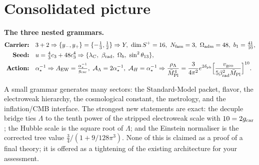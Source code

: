\section{Consolidated picture}

\par\medskip\noindent\textbf{The three nested grammars.}
\[
  \begin{aligned}
  \textbf{Carrier:}\quad & 3+2 \Rightarrow \{y_-,y_+\}=\{-\tfrac13,\tfrac12\}\Rightarrow Y,\ \dim S^+=16,\ \Nfam=3,\ \Oadm=48,\ b_1=\tfrac{41}{10},\\
  \textbf{Seed:}\quad & \useed=\tfrac43\cthree+48\cthree^4 \Rightarrow \{\lC,\ \betarad,\ \Omega_b,\ \sin^2\theta_{13}\},\\
  \textbf{Action:}\quad & \ainv \Rightarrow \AEW=\tfrac{\ainv}{\gcar},\ \AL=2\ainv,\ \AH=\ainv
  \Rightarrow \frac{\rho_\Lambda}{\Mbar^4}=\frac{3}{4\pi^2}e^{2\dph}\Bigl[\frac{v_{\mathrm{geo}}}{5\betarad^2\Mbar}\Bigr]^{10}.
  \end{aligned}
\]

\noindent A small grammar generates many sectors: the Standard-Model packet, flavor, the electroweak
hierarchy, the cosmological constant, the metrology, and the inflation/CMB interface. The strongest
new statements are exact: the decuple bridge ties $\Lambda$ to the tenth power of the stripped
electroweak scale with $10=2g_{\mathrm{car}}$; the Hubble scale is the square root of $\Lambda$; and the
Einstein normaliser is the corrected tree value $\tfrac34/(1+9/128\pi^3)$. None of this is claimed
as a proof of a final theory; it is offered as a tightening of the existing architecture for your
assessment.

